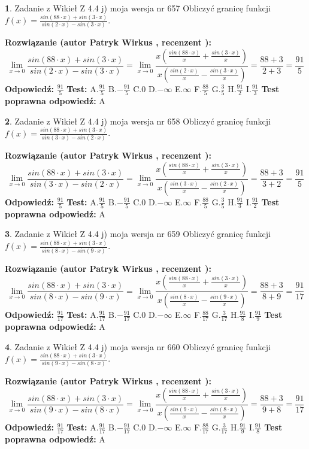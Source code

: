 \documentclass[12pt, a4paper]{article}
\theoremstyle{definition} %
\newtheorem{zad}{}
\newcommand{\zadStart}[1]{\begin{zad}#1\newline}
\newcommand{\zadStop}{\end{zad}}
\newcommand{\rozwStart}[2]{\noindent \textbf{Rozwiązanie (autor #1 , recenzent #2): }\newline}
\newcommand{\rozwStop}{\newline}
\newcommand{\odpStart}{\noindent \textbf{Odpowiedź:}\newline}
\newcommand{\odpStop}{\newline}
\newcommand{\testStart}{\noindent \textbf{Test:}\newline}
\newcommand{\testStop}{\newline}
\newcommand{\kluczStart}{\noindent \textbf{Test poprawna odpowiedź:}\newline}
\newcommand{\kluczStop}{\newline}
\begin{document}
\zadStart{Zadanie z Wikieł Z 4.4 j) moja wersja nr 657}
Obliczyć granicę funkcji $f(x)=\frac{sin(88\cdot x) +sin(3\cdot x)}{sin(2\cdot x) -sin(3\cdot x)}$.
\zadStop
\rozwStart{Patryk Wirkus}{}
$$\lim\limits_{x\to 0}\frac{sin(88\cdot x) +sin(3\cdot x)}{sin(2\cdot x) -sin(3\cdot x)}=\lim\limits_{x\to 0}\frac{x(\frac{sin(88\cdot x)}{x}+\frac{sin(3\cdot x)}{x})}{x(\frac{sin(2\cdot x)}{x}-\frac{sin(3\cdot x)}{x})}=\frac{88+3}{2+3} = \frac{91}{5}$$
\rozwStop
\odpStart
$\frac{91}{5}$
\odpStop
\testStart
A.$\frac{91}{5}$
B.$-\frac{91}{5}$
C.$0$
D.$-\infty$
E.$\infty$
F.$\frac{88}{5}$
G.$\frac{3}{5}$
H.$\frac{91}{2}$
I.$\frac{91}{3}$
\testStop
\kluczStart
A
\kluczStop



\zadStart{Zadanie z Wikieł Z 4.4 j) moja wersja nr 658}
Obliczyć granicę funkcji $f(x)=\frac{sin(88\cdot x) +sin(3\cdot x)}{sin(3\cdot x) -sin(2\cdot x)}$.
\zadStop
\rozwStart{Patryk Wirkus}{}
$$\lim\limits_{x\to 0}\frac{sin(88\cdot x) +sin(3\cdot x)}{sin(3\cdot x) -sin(2\cdot x)}=\lim\limits_{x\to 0}\frac{x(\frac{sin(88\cdot x)}{x}+\frac{sin(3\cdot x)}{x})}{x(\frac{sin(3\cdot x)}{x}-\frac{sin(2\cdot x)}{x})}=\frac{88+3}{3+2} = \frac{91}{5}$$
\rozwStop
\odpStart
$\frac{91}{5}$
\odpStop
\testStart
A.$\frac{91}{5}$
B.$-\frac{91}{5}$
C.$0$
D.$-\infty$
E.$\infty$
F.$\frac{88}{5}$
G.$\frac{3}{5}$
H.$\frac{91}{3}$
I.$\frac{91}{2}$
\testStop
\kluczStart
A
\kluczStop



\zadStart{Zadanie z Wikieł Z 4.4 j) moja wersja nr 659}
Obliczyć granicę funkcji $f(x)=\frac{sin(88\cdot x) +sin(3\cdot x)}{sin(8\cdot x) -sin(9\cdot x)}$.
\zadStop
\rozwStart{Patryk Wirkus}{}
$$\lim\limits_{x\to 0}\frac{sin(88\cdot x) +sin(3\cdot x)}{sin(8\cdot x) -sin(9\cdot x)}=\lim\limits_{x\to 0}\frac{x(\frac{sin(88\cdot x)}{x}+\frac{sin(3\cdot x)}{x})}{x(\frac{sin(8\cdot x)}{x}-\frac{sin(9\cdot x)}{x})}=\frac{88+3}{8+9} = \frac{91}{17}$$
\rozwStop
\odpStart
$\frac{91}{17}$
\odpStop
\testStart
A.$\frac{91}{17}$
B.$-\frac{91}{17}$
C.$0$
D.$-\infty$
E.$\infty$
F.$\frac{88}{17}$
G.$\frac{3}{17}$
H.$\frac{91}{8}$
I.$\frac{91}{9}$
\testStop
\kluczStart
A
\kluczStop



\zadStart{Zadanie z Wikieł Z 4.4 j) moja wersja nr 660}
Obliczyć granicę funkcji $f(x)=\frac{sin(88\cdot x) +sin(3\cdot x)}{sin(9\cdot x) -sin(8\cdot x)}$.
\zadStop
\rozwStart{Patryk Wirkus}{}
$$\lim\limits_{x\to 0}\frac{sin(88\cdot x) +sin(3\cdot x)}{sin(9\cdot x) -sin(8\cdot x)}=\lim\limits_{x\to 0}\frac{x(\frac{sin(88\cdot x)}{x}+\frac{sin(3\cdot x)}{x})}{x(\frac{sin(9\cdot x)}{x}-\frac{sin(8\cdot x)}{x})}=\frac{88+3}{9+8} = \frac{91}{17}$$
\rozwStop
\odpStart
$\frac{91}{17}$
\odpStop
\testStart
A.$\frac{91}{17}$
B.$-\frac{91}{17}$
C.$0$
D.$-\infty$
E.$\infty$
F.$\frac{88}{17}$
G.$\frac{3}{17}$
H.$\frac{91}{9}$
I.$\frac{91}{8}$
\testStop
\kluczStart
A
\kluczStop
\end{document}
